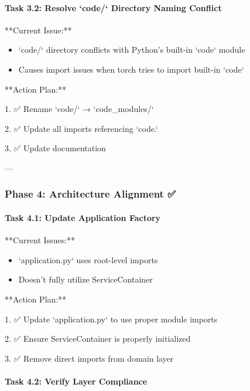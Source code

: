 \documentclass[11pt,a4paper]{article}
\begin{document}
\paragraph{Task 3.2: Resolve `code/` Directory Naming Conflict}

**Current Issue:**

\begin{itemize}
\item `code/` directory conflicts with Python's built-in `code` module
\end{itemize}

\begin{itemize}
\item Causes import issues when torch tries to import built-in `code`
\end{itemize}

**Action Plan:**

1. ✅ Rename `code/` → `code\_modules/`

2. ✅ Update all imports referencing `code.`

3. ✅ Update documentation

---

\subsubsection{Phase 4: Architecture Alignment ✅}

\paragraph{Task 4.1: Update Application Factory}

**Current Issues:**

\begin{itemize}
\item `application.py` uses root-level imports
\end{itemize}

\begin{itemize}
\item Doesn't fully utilize ServiceContainer
\end{itemize}

**Action Plan:**

1. ✅ Update `application.py` to use proper module imports

2. ✅ Ensure ServiceContainer is properly initialized

3. ✅ Remove direct imports from domain layer

\paragraph{Task 4.2: Verify Layer Compliance}
\end{document}
